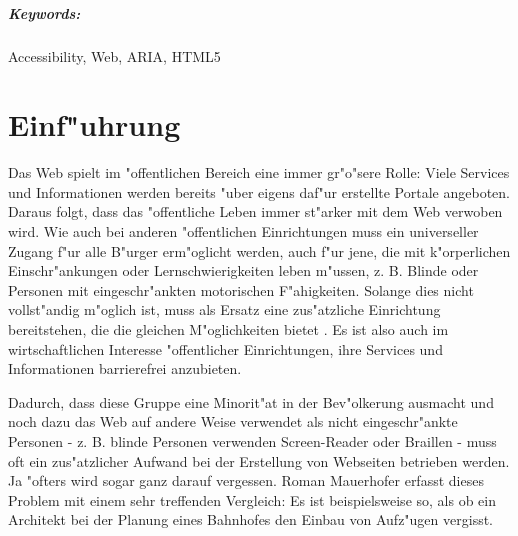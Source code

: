 \documentclass[a4paper,bibtotoc,oneside]{scrbook}
\begin{document}
\paragraph*{Keywords:} Accessibility, Web, ARIA, HTML5
\newpage


\tableofcontents\thispagestyle{empty}
\newpage

\setcounter{page}{1}

\chapter{Einf"uhrung}
Das Web spielt im "offentlichen Bereich eine immer gr"o"sere Rolle: Viele
Services und Informationen werden bereits "uber eigens daf"ur erstellte Portale angeboten. Daraus folgt, dass das "offentliche Leben immer st"arker mit dem Web verwoben wird. Wie auch bei anderen "offentlichen Einrichtungen muss ein universeller Zugang f"ur alle B"urger erm"oglicht werden, auch f"ur jene, die mit k"orperlichen Einschr"ankungen oder Lernschwierigkeiten leben m"ussen, z. B. Blinde oder Personen mit eingeschr"ankten motorischen F"ahigkeiten. Solange dies nicht vollst"andig m"oglich ist, muss als Ersatz eine zus"atzliche Einrichtung bereitstehen, die die gleichen M"oglichkeiten bietet \cite[S. 8]{understand_acc}. Es ist also auch im wirtschaftlichen Interesse "offentlicher Einrichtungen, ihre Services und Informationen barrierefrei anzubieten. 

Dadurch, dass diese Gruppe eine Minorit"at in der Bev"olkerung ausmacht und noch dazu das Web auf andere Weise verwendet als nicht eingeschr"ankte Personen - z. B. blinde Personen verwenden Screen-Reader oder Braillen - muss oft ein zus"atzlicher Aufwand bei der Erstellung von Webseiten betrieben werden. Ja "ofters wird sogar ganz darauf vergessen.\cite[S. 7]{mod_software} Roman Mauerhofer erfasst dieses Problem mit einem sehr treffenden Vergleich: \glqq Es ist beispielsweise so, als ob ein Architekt bei der Planung eines Bahnhofes den Einbau von Aufz"ugen vergisst.\grqq  \cite[S. 7]{mod_software}
\end{document}
